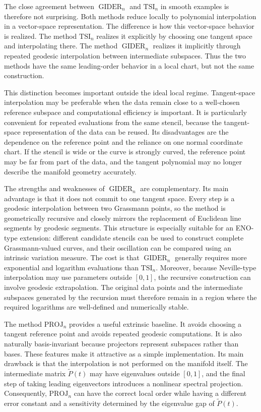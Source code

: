 \documentclass[a4paper,11pt]{article}
\newcommand{\GIDER}{\operatorname{GIDER}}
\numberwithin{equation}{section}
\theoremstyle{plain}
\theoremstyle{definition}
\theoremstyle{remark}
\begin{document}
The close agreement between \(\GIDER_n\) and \(\mathrm{TSI}_n\) in smooth examples is therefore not surprising.  Both methods reduce locally to polynomial interpolation in a vector-space representation.  The difference is how this vector-space behavior is realized.  The method \(\mathrm{TSI}_n\) realizes it explicitly by choosing one tangent space and interpolating there.  The method \(\GIDER_n\) realizes it implicitly through repeated geodesic interpolation between intermediate subspaces.  Thus the two methods have the same leading-order behavior in a local chart, but not the same construction.

This distinction becomes important outside the ideal local regime.  Tangent-space interpolation may be preferable when the data remain close to a well-chosen reference subspace and computational efficiency is important.  It is particularly convenient for repeated evaluations from the same stencil, because the tangent-space representation of the data can be reused.  Its disadvantages are the dependence on the reference point and the reliance on one normal coordinate chart.  If the stencil is wide or the curve is strongly curved, the reference point may be far from part of the data, and the tangent polynomial may no longer describe the manifold geometry accurately.

The strengths and weaknesses of \(\GIDER_n\) are complementary.  Its main advantage is that it does not commit to one tangent space.  Every step is a geodesic interpolation between two Grassmann points, so the method is geometrically recursive and closely mirrors the replacement of Euclidean line segments by geodesic segments.  This structure is especially suitable for an ENO-type extension: different candidate stencils can be used to construct complete Grassmann-valued curves, and their oscillation can be compared using an intrinsic variation measure.  The cost is that \(\GIDER_n\) generally requires more exponential and logarithm evaluations than \(\mathrm{TSI}_n\).  Moreover, because Neville-type interpolation may use parameters outside \([0,1]\), the recursive construction can involve geodesic extrapolation.  The original data points and the intermediate subspaces generated by the recursion must therefore remain in a region where the required logarithms are well-defined and numerically stable.

The method \(\mathrm{PROJ}_n\) provides a useful extrinsic baseline.  It avoids choosing a tangent reference point and avoids repeated geodesic computations.  It is also naturally basis-invariant because projectors represent subspaces rather than bases.  These features make it attractive as a simple implementation.  Its main drawback is that the interpolation is not performed on the manifold itself.  The intermediate matrix \(\widetilde P(t)\) may have eigenvalues outside \([0,1]\), and the final step of taking leading eigenvectors introduces a nonlinear spectral projection.  Consequently, \(\mathrm{PROJ}_n\) can have the correct local order while having a different error constant and a sensitivity determined by the eigenvalue gap of \(\widetilde P(t)\).
\end{document}
